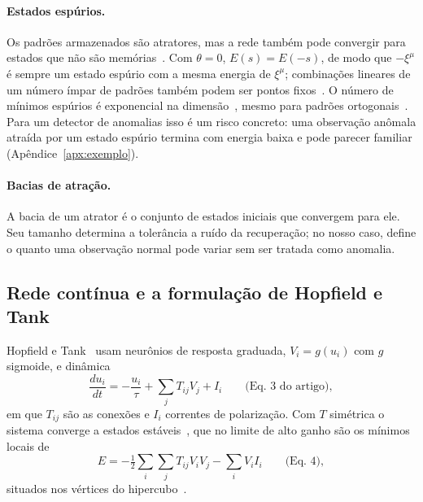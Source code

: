 \paragraph{Estados espúrios.} Os padrões armazenados são atratores, mas a rede também pode convergir para
estados que não são memórias~\cite{wikihopfield}. Com $\theta=0$, $E(s)=E(-s)$, de modo que $-\xi^\mu$ é
sempre um estado espúrio com a mesma energia de $\xi^\mu$; combinações lineares de um número ímpar de
padrões também podem ser pontos fixos~\cite{wikihopfield}. O número de mínimos espúrios é exponencial na
dimensão~\cite{ramsauer2021,bruckroychowdhury1990}, mesmo para padrões ortogonais~\cite{wikihopfield}. Para
um detector de anomalias isso é um risco concreto: uma observação anômala atraída por um estado espúrio
termina com energia baixa e pode parecer familiar (Apêndice~\ref{apx:exemplo}).

\paragraph{Bacias de atração.} A bacia de um atrator é o conjunto de estados iniciais que convergem para
ele. Seu tamanho determina a tolerância a ruído da recuperação; no nosso caso, define o quanto uma
observação normal pode variar sem ser tratada como anomalia.

\subsection{Rede contínua e a formulação de Hopfield e Tank}\label{sec:ht}
Hopfield e Tank~\cite{hopfieldtank1985} usam neurônios de resposta graduada, $V_i=g(u_i)$ com $g$ sigmoide, e
dinâmica
\begin{equation}\label{eq:ht-dyn}
\frac{du_i}{dt}=-\frac{u_i}{\tau}+\sum_jT_{ij}V_j+I_i\qquad\text{(Eq.~3 do artigo)},
\end{equation}
em que $T_{ij}$ são as conexões e $I_i$ correntes de polarização. Com $T$ simétrica o sistema converge a estados estáveis~\cite{hopfield1984,hopfieldtank1985}, que no limite de alto ganho são os mínimos locais de
\begin{equation}\label{eq:ht-energia}
E=-\tfrac12\sum_i\sum_jT_{ij}V_iV_j-\sum_iV_iI_i\qquad\text{(Eq.~4)},
\end{equation}
situados nos vértices do hipercubo~\cite{hopfieldtank1985}.

